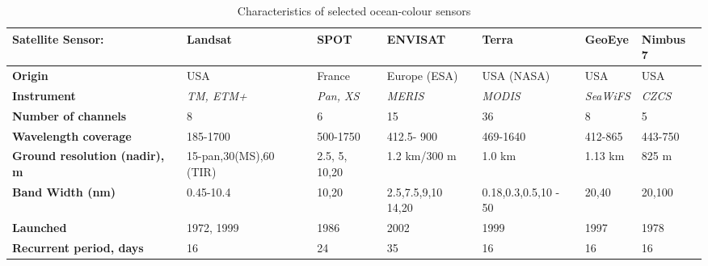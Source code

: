 \documentclass[10pt, a4paper]{article}
\begin{document}
\begin{table}[htbp]
	\caption{Characteristics of selected ocean-colour sensors}
	\begin{center}
		\begin{tabular}{|p{2cm}|p{20mm}|p{15mm}|p{17mm}|p{15mm}|p{15mm}|p{15mm}|}
			\hline\hline
			\textbf{Satellite Sensor:} & {\textbf{Landsat}} & {\textbf{SPOT}} & {\textbf{ENVISAT}} & {\textbf{Terra}} & {\textbf{GeoEye}} & {\textbf{Nimbus 7}} \\ \hline\hline
				\textbf{Origin} & USA & France & Europe (ESA) & USA (NASA) & USA & USA \\ \hline
				\textbf{Instrument} & \textit{TM, ETM+} & \textit{Pan, XS} & \textit{MERIS} & \textit{MODIS} & \textit{SeaWiFS} & \textit{CZCS}\\ \hline
			\textbf{Number of channels} & 8 & 6 & 15 & 36 & 8 & 5 \\ \hline
			\textbf{Wavelength coverage} & 185-1700 & 500-1750 & 412.5- 900 & 469-1640 & 412-865 & 443-750 \\ \hline
			\textbf{Ground resolution (nadir), m} & 15-pan,30(MS),60 (TIR) & 2.5, 5, 10,20 & 1.2 km/300 m & 1.0 km & 1.13 km & 825 m \\ \hline
			\textbf{Band Width (nm)} & 0.45-10.4 & 10,20 & 2.5,7.5,9,10 14,20 & 0.18,0.3,0.5,10 - 50 & 20,40 & 20,100 \\ \hline
			\textbf{Launched} & 1972, 1999 & 1986 & 2002 & 1999 & 1997 & 1978 \\ \hline
			\textbf{Recurrent period, days} & 16 & 24 & 35 & 16 & 16 & 16 \\ \hline
		\end{tabular}
	\end{center}
	\label{tab:1}
\end{table}
\end{document}
